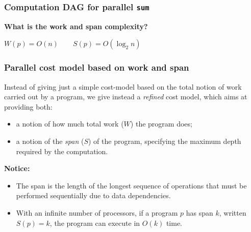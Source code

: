\begin{frame}
  \frametitle{Computation DAG for parallel \texttt{sum}}

  \begin{center}

\bigskip

  \textbf{What is the work and span complexity?}

  \end{center}

  \pause

$W(p) = O(n) \quad\quad S(p) = O(\log_{2} n)$

\end{frame}

\begin{frame}[fragile]
  \frametitle{Parallel cost model based on work and span}

  \vspace{1ex}

  Instead of giving just a simple cost-model based on the total notion
  of work carried out by a program, we give instead a \emph{refined}
  cost model, which aims at providing both:
  \begin{itemize}
  \item a notion of how much total work ($W$) the program does;
  \item a notion of the \emph{span} ($S$) of the program, specifying the maximum
    depth required by the computation.
  \end{itemize}

\bigskip\textbf{Notice:}

\begin{itemize}
  \item The span is the length of the longest sequence of operations
    that must be performed sequentially due to data dependencies.
  \item With an infinite number of processors, if a program $p$ has
    span $k$, written $S(p) = k$, the program can execute in $O(k)$
    time.
  \end{itemize}
\end{frame}

